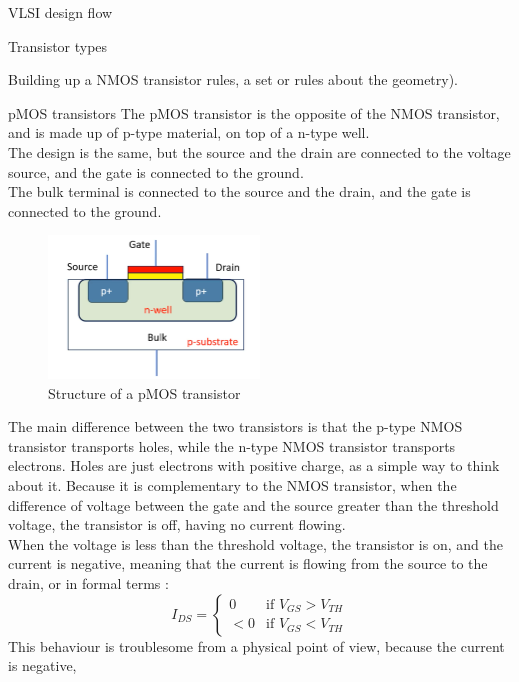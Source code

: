\begin{section}{VLSI design flow}
\begin{subsection}{Transistor types}
\begin{subsubsection}{Building up a NMOS transistor}
      rules, a set or rules about the geometry).
    \end{subsubsection}
    \begin{subsubsection}{pMOS transistors}
      The pMOS transistor is the opposite of the NMOS transistor, and is made up of p-type material,
      on top of a n-type well.\\
      The design is the same, but the source and the drain are connected to the voltage source, and
      the gate is connected to the ground.\\
      The bulk terminal is connected to the source and the drain, and the gate is connected to the 
      ground.
      \begin{figure}[h]
        \centering
        \includegraphics[width=0.5\textwidth]{img/hardware/pmos transistor.png}
        \caption{Structure of a pMOS transistor}
        \label{fig:pmos transistor}
      \end{figure}
      The main difference between the two transistors is that the p-type NMOS transistor transports
      holes, while the n-type NMOS transistor transports electrons. Holes are just electrons with
      positive charge, as a simple way to think about it. Because it is complementary to the NMOS
      transistor, when the difference of voltage between the gate and the source greater than the
      threshold voltage, the transistor is off, having no current flowing.\\
      When the voltage is less than the threshold voltage, the transistor is on, and the current is
      negative, meaning that the current is flowing from the source to the drain, or in formal terms
      :
      \begin{equation}
        I_{DS} = \begin{cases}
          0 & \text{if } V_{GS} > V_{TH}\\
          < 0 & \text{if } V_{GS} < V_{TH}
        \end{cases}
      \end{equation}
      This behaviour is troublesome from a physical point of view, because the current is negative,

\end{subsubsection}
\end{subsection}
\end{section}

